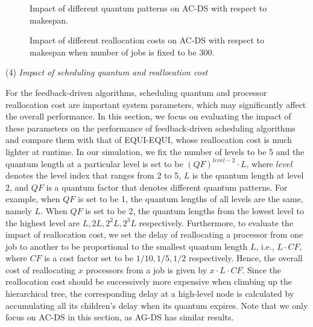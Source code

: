 \documentclass[10pt, a4paper]{article}
\begin{document}
\begin{figure}[t]
\centering
    \caption{Impact of different quantum patterns on AC-DS with respect to makespan.}
    \label{fig:DiffQuantum}
\end{figure}
\begin{figure*}[t]
\centering

    \caption{Impact of different reallocation costs on AC-DS with respect to makespan when number of jobs is fixed to be 300.}
    \label{fig:UtilizationAC}
\end{figure*}

\indent(4) \emph{Impact of scheduling quantum and reallocation cost}

For the feedback-driven algorithms, scheduling quantum and processor reallocation cost are
important system parameters, which may significantly affect the overall performance. In this
section, we focus on evaluating the impact of these parameters on the performance of
feedback-driven scheduling algorithms and compare them with that of EQUI-EQUI, whose reallocation
cost is much lighter at runtime. In our simulation, we fix the number of levels to be 5 and the
quantum length at a particular level is set to be $(QF)^{level-2}\cdot L$, where $level$ denotes
the level index that ranges from 2 to 5, $L$ is the quantum length at level 2, and $QF$ is a
quantum factor that denotes different quantum patterns. For example, when $QF$ is set to be 1, the
quantum lengths of all levels are the same, namely $L$. When $QF$ is set to be 2, the quantum
lengths from the lowest level to the highest level are $L, 2L, 2^2L, 2^3L$ respectively.
Furthermore, to evaluate the impact of reallocation cost, we set the delay of reallocating a
processor from one job to another to be proportional to the smallest quantum length $L$, i.e.,
$L\cdot CF$, where $CF$ is a cost factor set to be $1/10, 1/5, 1/2$ respectively. Hence, the
overall cost of reallocating $x$ processors from a job is given by $x\cdot L \cdot CF$.  Since the
reallocation cost should be successively more expensive when climbing up the hierarchical tree, the
corresponding delay at a high-level node is calculated by accumulating all its children's delay
when its quantum expires. Note that we only focus on AC-DS in this section, as AG-DS has similar
results.
\end{document}
